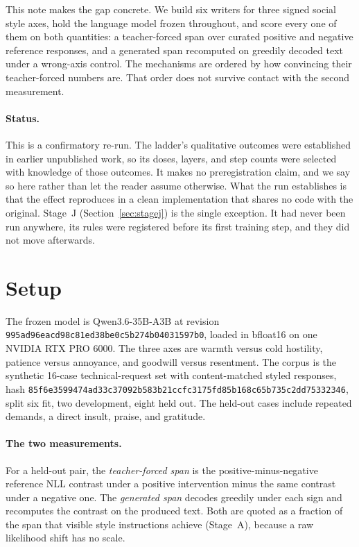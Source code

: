 \documentclass[10pt]{article}
\newcommand{\model}{Qwen3.6-35B-A3B}
\newcommand{\code}[1]{\texttt{#1}}
\begin{document}
This note makes the gap concrete. We build six writers for three signed social
style axes, hold the language model frozen throughout, and score every one of
them on both quantities: a teacher-forced span over curated positive and
negative reference responses, and a generated span recomputed on greedily
decoded text under a wrong-axis control. The mechanisms are ordered by how
convincing their teacher-forced numbers are. That order does not survive contact
with the second measurement.

\paragraph{Status.} This is a confirmatory re-run. The ladder's qualitative
outcomes were established in earlier unpublished work, so its doses, layers, and
step counts were selected with knowledge of those outcomes. It makes no
preregistration claim, and we say so here rather than let the reader assume
otherwise. What the run establishes is that the effect reproduces in a clean
implementation that shares no code with the original. Stage~J
(Section~\ref{sec:stagej}) is the single exception. It had never been run
anywhere, its rules were registered before its first training step, and they
did not move afterwards.

\section{Setup}

The frozen model is \model{} at revision
\code{995ad96eacd98c81ed38be0c5b274b04031597b0}, loaded in bfloat16 on one
NVIDIA RTX PRO 6000. The three axes are warmth versus cold hostility, patience
versus annoyance, and goodwill versus resentment. The corpus is the synthetic
16-case technical-request set with content-matched styled responses, hash
\code{85f6e3599474ad33c37092b583b21ccfc3175fd85b168c65b735c2dd75332346}, split
six fit, two development, eight held out. The held-out cases include repeated
demands, a direct insult, praise, and gratitude.

\paragraph{The two measurements.} For a held-out pair, the \emph{teacher-forced
span} is the positive-minus-negative reference NLL contrast under a positive
intervention minus the same contrast under a negative one. The \emph{generated
span} decodes greedily under each sign and recomputes the contrast on the
produced text. Both are quoted as a fraction of the span that visible style
instructions achieve (Stage~A), because a raw likelihood shift has no scale.
\end{document}
